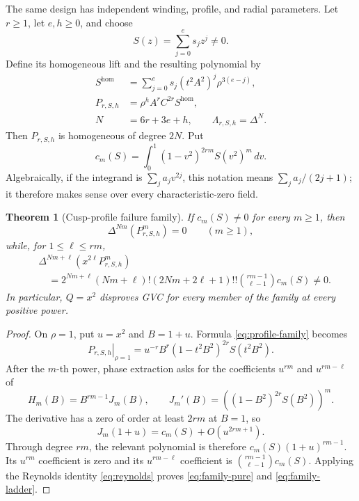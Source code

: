 \documentclass[11pt]{article}
\newtheorem{theorem}{Theorem}[section]
\begin{document}
The same design has independent winding, profile, and radial parameters.
Let $r\geq1$, let $e,h\geq0$, and choose
\[
 S(z)=\sum_{j=0}^e s_jz^j\ne0.
\]
Define its homogeneous lift and the resulting polynomial by
\begin{equation}\label{eq:profile-family}
 \begin{aligned}
 S^{\mathrm{hom}}
   &=\sum_{j=0}^e
      s_j(t^2A^2)^j\rho^{3(e-j)},\\
 P_{r,S,h}
   &=\rho^hA^rC^{2r}S^{\mathrm{hom}},\\
 N&=6r+3e+h,
 \qquad \Lambda_{r,S,h}=\Delta^N.
 \end{aligned}
\end{equation}
Then $P_{r,S,h}$ is homogeneous of degree $2N$.  Put
\begin{equation}\label{eq:profile-moment}
 c_m(S)=\int_0^1
   (1-v^2)^{2rm}S(v^2)^m\,dv.
\end{equation}
Algebraically, if the integrand is $\sum_j a_jv^{2j}$, this notation means
$\sum_j a_j/(2j+1)$; it therefore makes sense over every
characteristic-zero field.

\begin{theorem}[Cusp-profile failure family]\label{thm:family}
If $c_m(S)\ne0$ for every $m\geq1$, then
\begin{equation}\label{eq:family-pure}
 \Delta^{Nm}(P_{r,S,h}^m)=0
 \qquad(m\geq1),
\end{equation}
while, for $1\leq\ell\leq rm$,
\begin{equation}\label{eq:family-ladder}
 \begin{aligned}
 &\Delta^{Nm+\ell}
   \left(x^{2\ell}P_{r,S,h}^m\right)\\
 &\quad={}
 2^{Nm+\ell}(Nm+\ell)!(2Nm+2\ell+1)!!
 \binom{rm-1}{\ell-1}c_m(S)\ne0.
 \end{aligned}
\end{equation}
In particular, $Q=x^2$ disproves GVC for every member of the family at
every positive power.
\end{theorem}

\begin{proof}
On $\rho=1$, put $u=x^2$ and $B=1+u$.  Formula
\eqref{eq:profile-family} becomes
\[
 \left.P_{r,S,h}\right|_{\rho=1}
 =u^{-r}B^r(1-t^2B^2)^{2r}S(t^2B^2).
\]
After the $m$-th power, phase extraction asks for the coefficients
$u^{rm}$ and $u^{rm-\ell}$ of
\[
 H_m(B)=B^{rm-1}J_m(B),
 \qquad
 J_m'(B)=\left((1-B^2)^{2r}S(B^2)\right)^m.
\]
The derivative has a zero of order at least $2rm$ at $B=1$, so
\[
 J_m(1+u)=c_m(S)+O(u^{2rm+1}).
\]
Through degree $rm$, the relevant polynomial is therefore
$c_m(S)(1+u)^{rm-1}$.  Its $u^{rm}$ coefficient is zero and its
$u^{rm-\ell}$ coefficient is
$\binom{rm-1}{\ell-1}c_m(S)$.  Applying the Reynolds identity
\eqref{eq:reynolds} proves \eqref{eq:family-pure} and
\eqref{eq:family-ladder}.
\end{proof}
\end{document}
